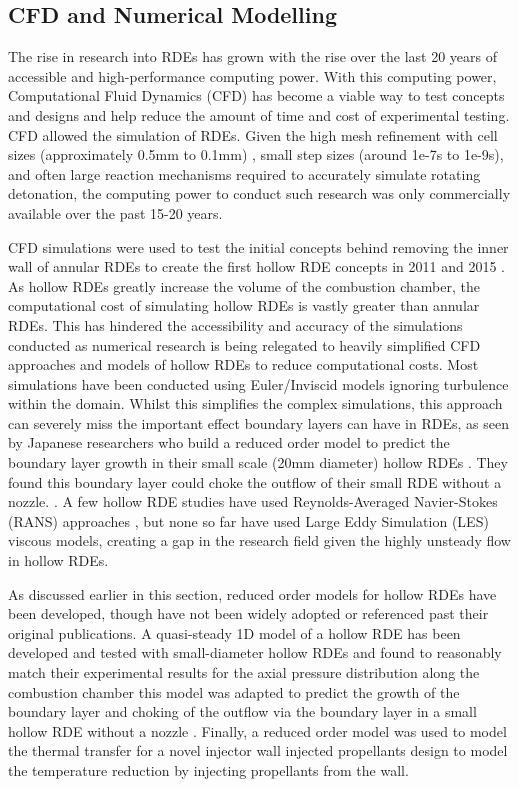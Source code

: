 \documentclass{article}
\begin{document}
\subsection{CFD and Numerical Modelling}

The rise in research into RDEs has grown with the rise over the last 20 years of accessible and high-performance computing power. With this computing power, Computational Fluid Dynamics (CFD) has become a viable way to test concepts and designs and help reduce the amount of time and cost of experimental testing. CFD allowed the simulation of RDEs. Given the high mesh refinement with cell sizes (approximately 0.5mm to 0.1mm) \cite{Nakata2022}, small step sizes (around 1e-7s to 1e-9s), and often large reaction mechanisms required to accurately simulate rotating detonation, the computing power to conduct such research was only commercially available over the past 15-20 years.
\par

CFD simulations were used to test the initial concepts behind removing the inner wall of annular RDEs to create the first hollow RDE concepts in 2011 and 2015 \cite{Shao2011,Tang2015,1Stoddard2015}. As hollow RDEs greatly increase the volume of the combustion chamber, the computational cost of simulating hollow RDEs is vastly greater than annular RDEs. This has hindered the accessibility and accuracy of the simulations conducted as numerical research is being relegated to heavily simplified CFD approaches and models of hollow RDEs to reduce computational costs. Most simulations have been conducted using Euler/Inviscid models \cite{Xia2018,Tang2015,Yao2017} ignoring turbulence within the domain. Whilst this simplifies the complex simulations, this approach can severely miss the important effect boundary layers can have in RDEs, as seen by Japanese researchers who build a reduced order model to predict the boundary layer growth in their small scale (20mm diameter) hollow RDEs \cite{Nakata2022,Yokoo2020}. They found this boundary layer could choke the outflow of their small RDE without a nozzle. \cite{Nakata2022,Yokoo2020}. A few hollow RDE studies have used Reynolds-Averaged Navier-Stokes (RANS) approaches \cite{Sun2019}, but none so far have used Large Eddy Simulation (LES) viscous models, creating a gap in the research field given the highly unsteady flow in hollow RDEs.
\par

As discussed earlier in this section, reduced order models for hollow RDEs have been developed, though have not been widely adopted or referenced past their original publications. A quasi-steady 1D model of a hollow RDE has been developed and tested with small-diameter hollow RDEs and found to reasonably match their experimental results for the axial pressure distribution along the combustion chamber \cite{Nakata2022} this model was adapted to predict the growth of the boundary layer and choking of the outflow via the boundary layer in a small hollow RDE without a nozzle \cite{Yokoo2021}. Finally, a reduced order model was used to model the thermal transfer for a novel injector wall injected propellants design to model the temperature reduction by injecting propellants from the wall.
\par
\end{document}
